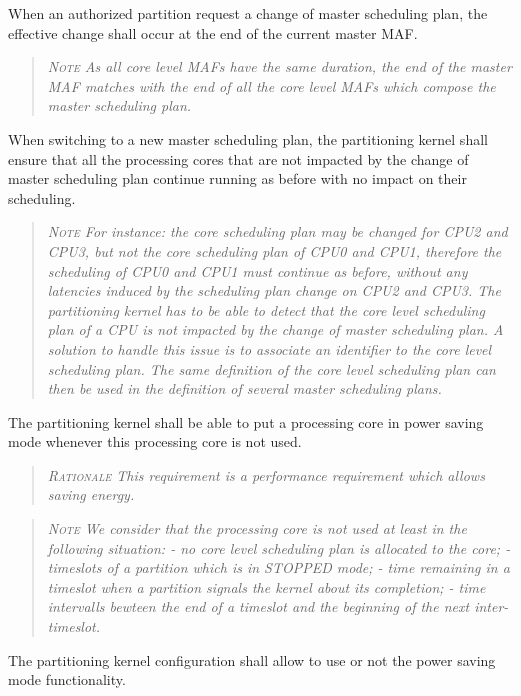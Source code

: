 When an authorized partition request a change of master scheduling plan, the effective change shall occur at the end of the current master MAF.
\begin{quote}\it
\textsc{Note}
As all core level MAFs have the same duration, the end of the master MAF matches with the end of all the core level MAFs which compose the master scheduling plan.
\end{quote}

When switching to a new master scheduling plan, the partitioning kernel shall ensure that all the processing cores that are not impacted by the change of master scheduling plan continue running as before with no impact on their scheduling.
\begin{quote}\it
\textsc{Note}
For instance: the core scheduling plan may be changed for CPU2 and CPU3, but not the core scheduling plan of CPU0 and CPU1, therefore the scheduling of CPU0 and CPU1 must continue as before, without any latencies induced by the scheduling plan change on CPU2 and CPU3.
The partitioning kernel has to be able to detect that the core level scheduling plan of a CPU is not impacted by the change of master scheduling plan. A solution to handle this issue is to associate an identifier to the core level scheduling plan. The same definition of the core level scheduling plan can then be used in the definition of several master scheduling plans.
\end{quote}

The partitioning kernel shall be able to put a processing core in power saving mode whenever this processing core is not used.
\begin{quote}\it
\textsc{Rationale}
This requirement is a performance requirement which allows saving energy.
\end{quote}
\begin{quote}\it
\textsc{Note}
We consider that the processing core is not used at least in the following situation:
- no core level scheduling plan is allocated to the core;
- timeslots of a partition which is in STOPPED mode;
- time remaining in a timeslot when a partition signals the kernel about its completion;
- time intervalls bewteen the end of a timeslot and the beginning of the next inter-timeslot.
\end{quote}

The partitioning kernel configuration shall allow to use or not the power saving mode functionality.


